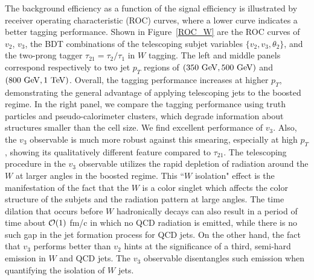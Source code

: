 \documentclass[aps,prl,floatfix,preprintnumbers,twocolumn,groupedaddress,nofootinbib]{revtex4-1}
\begin{document}
The background efficiency as a function of the signal efficiency is illustrated by receiver operating characteristic (ROC) curves, where a lower curve indicates a better tagging performance. Shown in Figure~\ref{ROC_W} are the ROC curves of $v_2$, $v_3$, the BDT combinations of the telescoping subjet variables $\{v_2, v_3, \theta_2\}$, and the two-prong tagger $\tau_{21}=\tau_{2}/\tau_{1}$ in $W$ tagging. The left and middle panels correspond respectively to two jet $p_T$ regions of $(350~{\rm GeV}, 500~{\rm GeV})$ and $(800~{\rm GeV}, 1~{\rm TeV})$. Overall, the tagging performance increases at higher $p_T$, demonstrating the general advantage of applying telescoping jets to the boosted regime. In the right panel, we compare the tagging performance using truth particles and pseudo-calorimeter clusters, which degrade information about structures smaller than the cell size. We find excellent performance of $v_3$. Also, the $v_3$ observable is much more robust against this smearing, especially at high $p_T$, showing its qualitatively different feature compared to $\tau_{21}$. The telescoping procedure in the $v_3$ observable utilizes the rapid depletion of radiation around the $W$ at larger angles in the boosted regime. This ``$W$ isolation" effect is the manifestation of the fact that the $W$ is a color singlet which affects the color structure of the subjets and the radiation pattern at large angles. The time dilation that occurs before $W$ hadronically decays can also result in a period of time about ${\cal O}(1)$ fm/c \cite{Apolinario:2017sob} in which no QCD radiation is emitted, while there is no such gap in the jet formation process for QCD jets. On the other hand, the fact that $v_3$ performs better than $v_2$ hints at the significance of a third, semi-hard emission in $W$ and QCD jets. The $v_3$ observable disentangles such emission when quantifying the isolation of $W$ jets.
\end{document}
